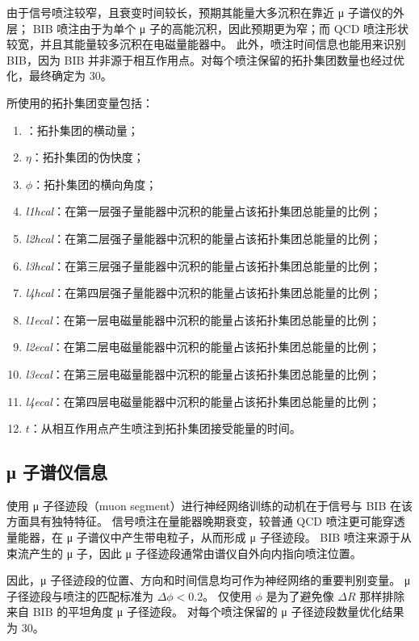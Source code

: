 由于信号喷注较窄，且衰变时间较长，预期其能量大多沉积在靠近 μ 子谱仪的外层；
BIB 喷注由于为单个 μ 子的高能沉积，因此预期更为窄；而 QCD 喷注形状较宽，并且其能量较多沉积在电磁量能器中。
此外，喷注时间信息也能用来识别 BIB，因为 BIB 并非源于相互作用点。对每个喷注保留的拓扑集团数量也经过优化，最终确定为 30。

所使用的拓扑集团变量包括：
\begin{enumerate}
      \item \pt：拓扑集团的横动量；
      \item $\eta$：拓扑集团的伪快度；
      \item $\phi$：拓扑集团的横向角度；
      \item \textit{l1hcal}：在第一层强子量能器中沉积的能量占该拓扑集团总能量的比例；
      \item \textit{l2hcal}：在第二层强子量能器中沉积的能量占该拓扑集团总能量的比例；
      \item \textit{l3hcal}：在第三层强子量能器中沉积的能量占该拓扑集团总能量的比例；
      \item \textit{l4hcal}：在第四层强子量能器中沉积的能量占该拓扑集团总能量的比例；
      \item \textit{l1ecal}：在第一层电磁量能器中沉积的能量占该拓扑集团总能量的比例；
      \item \textit{l2ecal}：在第二层电磁量能器中沉积的能量占该拓扑集团总能量的比例；
      \item \textit{l3ecal}：在第三层电磁量能器中沉积的能量占该拓扑集团总能量的比例；
      \item \textit{l4ecal}：在第四层电磁量能器中沉积的能量占该拓扑集团总能量的比例；
      \item $t$：从相互作用点产生喷注到拓扑集团接受能量的时间。
\end{enumerate}

\subsection{μ 子谱仪信息}
使用 μ 子径迹段（muon segment）进行神经网络训练的动机在于信号与 BIB 在该方面具有独特特征。
信号喷注在量能器晚期衰变，较普通 QCD 喷注更可能穿透量能器，在 μ 子谱仪中产生带电粒子，从而形成 μ 子径迹段。
BIB 喷注来源于从束流产生的 μ 子，因此 μ 子径迹段通常由谱仪自外向内指向喷注位置。

因此，μ 子径迹段的位置、方向和时间信息均可作为神经网络的重要判别变量。
μ 子径迹段与喷注的匹配标准为 $\Delta \phi < 0.2$。
仅使用 $\phi$ 是为了避免像 $\Delta R$ 那样排除来自 BIB 的平坦角度 μ 子径迹段。
对每个喷注保留的 μ 子径迹段数量优化结果为 30。

